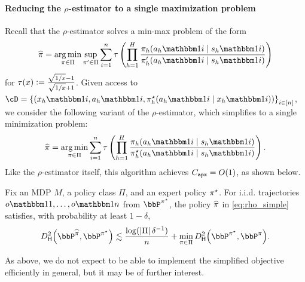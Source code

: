 \paragraph{Reducing the $\rho$-estimator to a single maximization problem}
Recall that the $\rho$-estimator solves a min-max problem of the form
\[
\pihat = \argmin_{\pi \in \Pi} \sup_{\pi' \in \Pi} 
\sum_{i=1}^n \tau\left(
  \prod_{h=1}^{H}\frac{\pi_h(a_h\ind{i}\mid{}s_h\ind{i})}{\pi'_h(a_h\ind{i}\mid{}s_h\ind{i})}
\right)
\]
for $\tau(x) \vcentcolon= \frac{\sqrt{1/x} - 1}{\sqrt{1/x} + 1}$. Given
access to \densobs
$\cD=\crl*{(x_h\ind{i},a_h\ind{i},\pistar_h(a_h\ind{i}\mid{}x_h\ind{i}))}_{i\in\brk{n}}$,
we consider the following variant of the $\rho$-estimator, which
simplifies to a single minimization problem:
\begin{align}
  \label{eq:rho_simple}
  \pihat = \argmin_{\pi \in \Pi}
\sum_{i=1}^n \tau\left(
  \prod_{h=1}^{H}\frac{\pi_h(a_h\ind{i}\mid{}s_h\ind{i})}{\pistar_h(a_h\ind{i}\mid{}s_h\ind{i})}
\right).
\end{align}
Like the $\rho$-estimator itself, this algorithm achieves
$C_{\texttt{apx}}=O(1)$, as shown below.
\begin{proposition}
  \label{prop:rho_simple}
Fix an MDP $M$, a policy class $\Pi$, and an expert policy $\pi^{\star}$. For i.i.d. trajectories $o\ind{1},\dots,o\ind{n}$ from $\bbP^{\pistar}$, the policy $\widehat{\pi}$ in \cref{eq:rho_simple} satisfies, with
probability at least $1-\delta$, 
\begin{align}
    \Dhels{\bbP^{\pihat}}{\bbP^{\pistar}} 
  \approxleq{} \frac{\log(\abs{\Pi}\delta^{-1})}{n}
      +   \min_{\pi\in\Pi}\Dhels{\bbP^{\pistar}}{\bbP^{\pi}}.
\end{align}
\end{proposition}
As above, we do not expect to be able to implement
the simplified objective efficiently in general, but it may be of
further interest.

